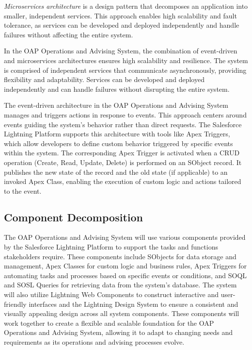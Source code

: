 \documentclass[12pt]{article}
\begin{document}
\textit{Microservices architecture} is a design pattern that decomposes an application into smaller, independent services. This approach enables high scalability and fault tolerance, as services can be developed and deployed independently and handle failures without affecting the entire system.

In the OAP Operations and Advising System, the combination of event-driven and microservices architectures ensures high scalability and resilience. The system is comprised of independent services that communicate asynchronously, providing flexibility and adaptability. Services can be developed and deployed independently and can handle failures without disrupting the entire system.

The event-driven architecture in the OAP Operations and Advising System manages and triggers actions in response to events. This approach centers around events guiding the system's behavior rather than direct requests. The Salesforce Lightning Platform supports this architecture with tools like Apex Triggers, which allow developers to define custom behavior triggered by specific events within the system. The corresponding Apex Trigger is activated when a CRUD operation (Create, Read, Update, Delete) is performed on an SObject record. It publishes the new state of the record and the old state (if applicable) to an invoked Apex Class, enabling the execution of custom logic and actions tailored to the event.

\subsection{Component Decomposition}
The OAP Operations and Advising System will use various components provided by the Salesforce Lightning Platform to support the tasks and functions stakeholders require. These components include SObjects for data storage and management, Apex Classes for custom logic and business rules, Apex Triggers for automating tasks and processes based on specific events or conditions, and SOQL and SOSL Queries for retrieving data from the system's database. The system will also utilize Lightning Web Components to construct interactive and user-friendly interfaces and the Lightning Design System to ensure a consistent and visually appealing design across all system components. These components will work together to create a flexible and scalable foundation for the OAP Operations and Advising System, allowing it to adapt to changing needs and requirements as its operations and advising processes evolve.
\end{document}
